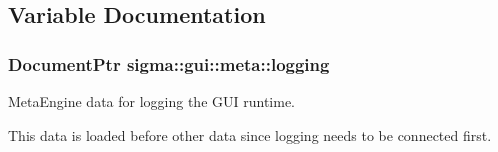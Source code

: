 \subsection{Variable Documentation}
\hypertarget{namespacesigma_1_1gui_1_1meta_af8a3f5120e5f27ccb51344b13cc72f85}{}
\subsubsection[{logging}]{\setlength{\rightskip}{0pt plus 5cm}Document\+Ptr sigma\+::gui\+::meta\+::logging}\label{namespacesigma_1_1gui_1_1meta_af8a3f5120e5f27ccb51344b13cc72f85}


Meta\+Engine data for logging the G\+U\+I runtime. 

This data is loaded before other data since logging needs to be connected first. 